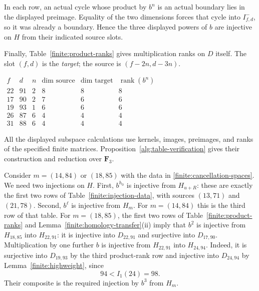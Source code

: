\documentclass[11pt]{article}
\theoremstyle{definition}
\theoremstyle{remark}
\numberwithin{equation}{section}
\begin{document}
In each row, an actual cycle whose product by $b^n$ is an actual
boundary lies in the displayed preimage.  Equality of the two
dimensions forces that cycle into $I^-_{f,d}$, so it was already
a boundary.  Hence the three displayed powers of $b$ are injective
on $H$ from their indicated source slots.

Finally, Table~\ref{finite:product-ranks} gives multiplication ranks
on $D$ itself.  The slot $(f,d)$ is the \emph{target}; the source is
$(f-2n,d-3n)$.

\begin{table}[htbp]

\(
\begin{array}{ccr|rrr}
 f&d&n&\dim\text{ source}&\dim\text{ target}&\operatorname{rank}(b^n)\\\hline
 22&91&2&8&8&8\\
 17&90&2&7&6&6\\
 19&93&1&6&6&6\\
 26&87&6&4&4&4\\
 31&88&6&4&4&4
\end{array}
\)
\caption{Ranks of multiplication by powers of $b$ on $D$.}
\label{finite:product-ranks}
\end{table}

All the displayed subspace calculations use kernels, images,
preimages, and ranks of the specified finite matrices.
Proposition~\ref{alg:table-verification} gives their
construction and reduction over $\mathbf F_3$.

Consider $m=(14,84)$ or $(18,85)$ with the data in
\eqref{finite:cancellation-spaces}.  We need two injections on $H$.
First, $b^{h_0}$ is injective from $H_{u+R}$: these are exactly
the first two rows of Table~\ref{finite:injection-data}, with sources
$(13,71)$ and $(21,78)$.  Second, $b^\ell$ is injective from
$H_m$.  For $m=(14,84)$ this is the third row of that table.
For $m=(18,85)$, the first two rows of
Table~\ref{finite:product-ranks} and
Lemma~\ref{finite:homology-transfer}\textup{(ii)} imply that $b^2$
is injective from $H_{18,85}$ into $H_{22,91}$: it is injective
into $D_{22,91}$ and surjective into $D_{17,90}$.
Multiplication by one further $b$ is injective from $H_{22,91}$
into $H_{24,94}$.  Indeed, it is surjective into $D_{19,93}$ by
the third product-rank row and injective into $D_{24,94}$ by
Lemma~\ref{finite:highweight}, since
\[
 94<I_1(24)=98.
\]
Their composite is the required injection by $b^3$ from $H_m$.
\end{document}
